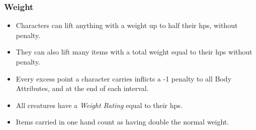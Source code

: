 \subsubsection*{Weight}

\begin{itemize}
  \item
  Characters can lift anything with a \gls{weight} up to half their \glspl{hp}, without penalty.
  \item
  They can also lift many items with a total \gls{weight} equal to their \glspl{hp} without penalty.
  \item
  Every excess point a character carries inflicts a -1 penalty to all Body Attributes, and  at the end of each \gls{interval}.
  \item
  All creatures have a \textit{Weight Rating} equal to their \glspl{hp}.
  \item
  Items carried in one hand count as having double the normal \gls{weight}.
\end{itemize}
